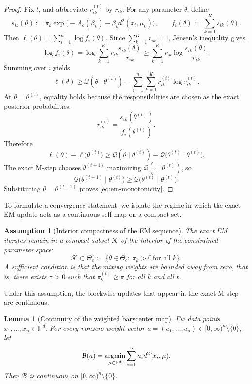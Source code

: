 \documentclass[11pt]{article}
\newtheorem{lemma}[theorem]{Lemma}
\newtheorem{assumption}[theorem]{Assumption}
\begin{document}
\begin{proof}
Fix \(t\), and abbreviate \(r_{ik}^{(t)}\) by \(r_{ik}\). For any parameter \(\theta\), define
\[
s_{ik}(\theta)
:=
\pi_k
\exp\bigl(-A_d(\beta_k)-\beta_k d^2(x_i,\mu_k)\bigr),
\qquad
f_i(\theta):=\sum_{k=1}^K s_{ik}(\theta).
\]
Then \(\ell(\theta)=\sum_{i=1}^n \log f_i(\theta)\). Since \(\sum_{k=1}^K r_{ik}=1\), Jensen's inequality gives
\[
\log f_i(\theta)
=
\log\sum_{k=1}^K r_{ik}\frac{s_{ik}(\theta)}{r_{ik}}
\ge
\sum_{k=1}^K r_{ik}\log\frac{s_{ik}(\theta)}{r_{ik}}.
\]
Summing over \(i\) yields
\begin{equation}\label{eq:em-lower-bound}
\ell(\theta)
\ge
\mathcal{Q}(\theta\mid\theta^{(t)})
-
\sum_{i=1}^n\sum_{k=1}^K r_{ik}^{(t)}\log r_{ik}^{(t)}.
\end{equation}
At \(\theta=\theta^{(t)}\), equality holds because the responsibilities are chosen as the exact posterior probabilities:
\[
r_{ik}^{(t)}
=
\frac{s_{ik}(\theta^{(t)})}{f_i(\theta^{(t)})}.
\]
Therefore
\[
\ell(\theta)-\ell\bigl(\theta^{(t)}\bigr)
\ge
\mathcal{Q}(\theta\mid\theta^{(t)})
-
\mathcal{Q}\bigl(\theta^{(t)}\mid\theta^{(t)}\bigr).
\]
The exact M-step chooses \(\theta^{(t+1)}\) maximizing \(\mathcal{Q}(\cdot\mid\theta^{(t)})\), so
\[
\mathcal{Q}\bigl(\theta^{(t+1)}\mid\theta^{(t)}\bigr)
\ge
\mathcal{Q}\bigl(\theta^{(t)}\mid\theta^{(t)}\bigr).
\]
Substituting \(\theta=\theta^{(t+1)}\) proves \eqref{eq:em-monotonicity}.
\end{proof}

To formulate a convergence statement, we isolate the regime in which the exact EM update acts as a continuous self-map on a compact set.

\begin{assumption}[Interior compactness of the EM sequence]\label{ass:interior-compactness}
The exact EM iterates remain in a compact subset \(\mathcal{K}\) of the interior of the constrained parameter space:
\[
\mathcal{K}\subset \Theta_c^\circ
:=
\bigl\{
\theta\in\Theta_c:\ \pi_k>0\ \text{for all }k
\bigr\}.
\]
A sufficient condition is that the mixing weights are bounded away from zero, that is, there exists \(\underline{\pi}>0\) such that \(\pi_k^{(t)}\ge \underline{\pi}\) for all \(k\) and all \(t\).
\end{assumption}

Under this assumption, the blockwise updates that appear in the exact M-step are continuous.

\begin{lemma}[Continuity of the weighted barycenter map]\label{lem:barycenter-map-continuity}
Fix data points \(x_1,\ldots,x_n\in\mathbb{H}^d\). For every nonzero weight vector \(a=(a_1,\ldots,a_n)\in[0,\infty)^n\setminus\{0\}\), let
\[
\mathcal{B}(a)
=
\operatorname*{argmin}_{\mu\in\mathbb{H}^d}\sum_{i=1}^n a_i d^2(x_i,\mu).
\]
Then \(\mathcal{B}\) is continuous on \([0,\infty)^n\setminus\{0\}\).
\end{lemma}
\end{document}
